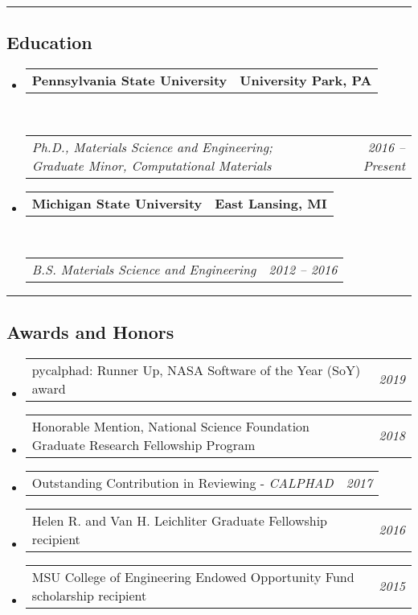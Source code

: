 \documentclass[10pt,letterpaper]{article}
\makeatletter
\newcommand{\headerrow}[2]
{\begin{tabular*}{\linewidth}{l@{\extracolsep{\fill}}r}
  #1 &
  #2 \\
\end{tabular*}}
\makeatother
\begin{document}
\hrule
\vspace{-0.6em}
\subsection*{Education}

\begin{itemize}
  \parskip=0.1em

  \item
  \headerrow
    {\textbf{Pennsylvania State University}}
    {\textbf{University Park, PA}}
  \\
  \headerrow
    {\emph{Ph.D., Materials Science and Engineering; Graduate Minor, Computational Materials}}
    {\emph{2016 -- Present}}


  \item
  \headerrow
    {\textbf{Michigan State University}}
    {\textbf{East Lansing, MI}}
  \\
  \headerrow
    {\emph{B.S. Materials Science and Engineering}}
    {\emph{2012 -- 2016}}

\end{itemize}

\hrule
\vspace{-0.6em}
\subsection*{Awards and Honors}

\begin{itemize}
  \parskip=0.1em

  \item
  \headerrow
       {pycalphad: Runner Up, NASA Software of the Year (SoY) award}
       {\emph{2019}}
  \item
  \headerrow
       {Honorable Mention, National Science Foundation Graduate Research Fellowship Program}
       {\emph{2018}}
  \item
  \headerrow
    {Outstanding Contribution in Reviewing - \emph{CALPHAD}}
    {\emph{2017}}
  \item
  \headerrow
    {Helen R. and Van H. Leichliter Graduate Fellowship recipient} {\emph{2016}}
  \item
  \headerrow
    {MSU College of Engineering Endowed Opportunity Fund scholarship recipient} {\emph{2015}}

\end{itemize}
\end{document}
